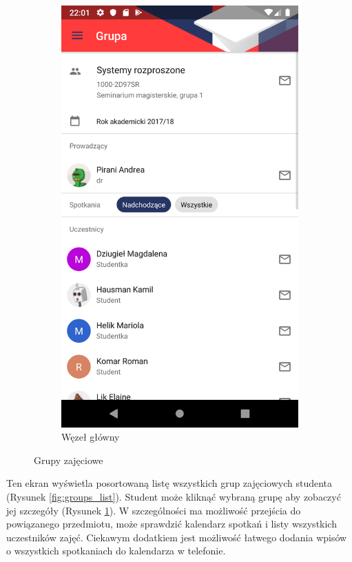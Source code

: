 \documentclass{pracamgr}
\begin{document}
\begin{figure}[p]
	\quad
	\begin{subfigure}[t]{0.3\textwidth}
		\includegraphics[width=\textwidth]{img/groups_group.png}
		\caption{Węzeł główny}
		\label{fig:groups_group}
	\end{subfigure}
	\caption{Grupy zajęciowe}\label{fig:groups}
	\medskip
\end{figure}

Ten ekran wyświetla posortowaną listę wszystkich grup zajęciowych studenta (Rysunek \ref{fig:groups_list}).
Student może kliknąć wybraną grupę aby zobaczyć jej szczegóły (Rysunek \ref{fig:groups_group}). W szczególności
ma możliwość przejścia do powiązanego przedmiotu, może sprawdzić kalendarz spotkań
i listy wszystkich uczestników zajęć. Ciekawym dodatkiem jest możliwość łatwego
dodania wpisów o wszystkich spotkaniach do kalendarza w telefonie.
\end{document}
